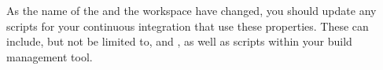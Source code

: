  As the name of the \gddb{} and the workspace have changed, you should update any scripts for your continuous integration that use these properties. These can include, but not be limited to,  and , as well as scripts within your build management tool.
